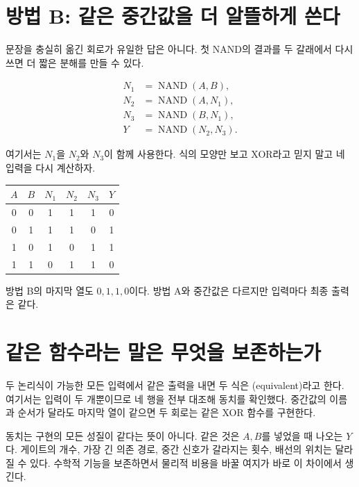 \section{방법 B: 같은 중간값을 더 알뜰하게 쓴다}

문장을 충실히 옮긴 회로가 유일한 답은 아니다. 첫 NAND의 결과를 두 갈래에서 다시 쓰면 더 짧은 분해를 만들 수 있다.

\begin{align*}
  N_1 &= \operatorname{NAND}(A,B),\\
  N_2 &= \operatorname{NAND}(A,N_1),\\
  N_3 &= \operatorname{NAND}(B,N_1),\\
  Y   &= \operatorname{NAND}(N_2,N_3).
\end{align*}

여기서는 $N_1$을 $N_2$와 $N_3$이 함께 사용한다. 식의 모양만 보고 XOR라고 믿지 말고 네 입력을 다시 계산하자.

\begin{center}
\small
\begin{tabular}{cccccc}
\toprule
\sffamily\bfseries $A$ & \sffamily\bfseries $B$ & \sffamily\bfseries $N_1$ & \sffamily\bfseries $N_2$ & \sffamily\bfseries $N_3$ & \sffamily\bfseries $Y$ \\
\midrule
0 & 0 & 1 & 1 & 1 & 0 \\
0 & 1 & 1 & 1 & 0 & 1 \\
1 & 0 & 1 & 0 & 1 & 1 \\
1 & 1 & 0 & 1 & 1 & 0 \\
\bottomrule
\end{tabular}
\end{center}

방법 B의 마지막 열도 $0,1,1,0$이다. 방법 A와 중간값은 다르지만 입력마다 최종 출력은 같다.

\section{같은 함수라는 말은 무엇을 보존하는가}

두 논리식이 가능한 모든 입력에서 같은 출력을 내면 두 식은 (equivalent)라고 한다. 여기서는 입력이 두 개뿐이므로 네 행을 전부 대조해 동치를 확인했다. 중간값의 이름과 순서가 달라도 마지막 열이 같으면 두 회로는 같은 XOR 함수를 구현한다.

동치는 구현의 모든 성질이 같다는 뜻이 아니다. 같은 것은 $A,B$를 넣었을 때 나오는 $Y$다. 게이트의 개수, 가장 긴 의존 경로, 중간 신호가 갈라지는 횟수, 배선의 위치는 달라질 수 있다. 수학적 기능을 보존하면서 물리적 비용을 바꿀 여지가 바로 이 차이에서 생긴다.

